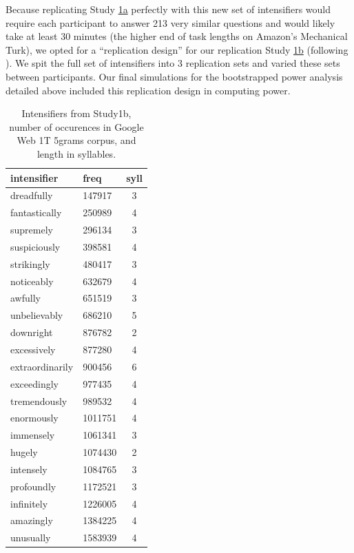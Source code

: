 \documentclass[10pt,letterpaper]{article}
\begin{document}
Because replicating Study \hyperref[sec:study1a]{1a} perfectly with this new set of intensifiers would require each participant to answer 213 very similar questions and would likely take at least 30 minutes (the higher end of task lengths on Amazon’s Mechanical Turk), we opted for a ``replication design'' for our replication Study \hyperref[sec:study1b]{1b} (following ). We spit the full set of intensifiers into 3 replication sets and varied these sets between participants. Our final simulations for the bootstrapped power analysis detailed above included this replication design in computing power.

\begin{table}[ht]
 \begin{center}
 \footnotesize
  \caption{Intensifiers from Study1b, number of occurences in Google Web 1T 5grams corpus, and length in syllables.}
  \label{table:intensifiers_study1b}
  \begin{tabular}{llc}
   \hline
   intensifier & freq & syll \\
   \hline
    dreadfully & 147917 & 3 \\ 
    fantastically & 250989 & 4 \\ 
    supremely & 296134 & 3 \\ 
    suspiciously & 398581 & 4 \\ 
    strikingly & 480417 & 3 \\ 
    noticeably & 632679 & 4 \\ 
    awfully & 651519 & 3 \\ 
    unbelievably & 686210 & 5 \\ 
    downright & 876782 & 2 \\ 
    excessively & 877280 & 4 \\ 
    extraordinarily & 900456 & 6 \\ 
    exceedingly & 977435 & 4 \\ 
    tremendously & 989532 & 4 \\ 
    enormously & 1011751 & 4 \\ 
    immensely & 1061341 & 3 \\ 
    hugely & 1074430 & 2 \\ 
    intensely & 1084765 & 3 \\ 
    profoundly & 1172521 & 3 \\ 
    infinitely & 1226005 & 4 \\ 
    amazingly & 1384225 & 4 \\ 
    unusually & 1583939 & 4 \\ 

\end{tabular}
\end{center}
\end{table}
\end{document}
